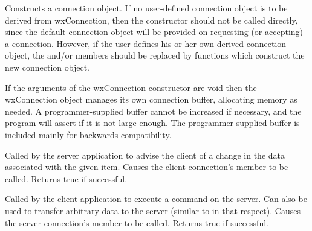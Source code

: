 
\label{wxconnectionctor}



Constructs a connection object. If no user-defined connection
object is to be derived from wxConnection, then the constructor
should not be called directly, since the default connection
object will be provided on requesting (or accepting) a
connection. However, if the user defines his or her own derived
connection object, the \rtfsp
and/or  
members should be replaced by functions which construct the new
connection object.

If the arguments of the wxConnection constructor are void then
the wxConnection object manages its own connection buffer,
allocating memory as needed. A programmer-supplied buffer cannot
be increased if necessary, and the program will assert if it is
not large enough. The programmer-supplied buffer is included
mainly for backwards compatibility.

\label{wxconnectionadvise}


Called by the server application to advise the client of a change
in the data associated with the given item. Causes the client
connection's  member
to be called. Returns true if successful.

\label{wxconnectionexecute}


Called by the client application to execute a command on the
server. Can also be used to transfer arbitrary data to the server
(similar to  in
that respect). Causes the server connection's  
member to be called. Returns true if successful.

\label{wxconnectiondisconnect}

